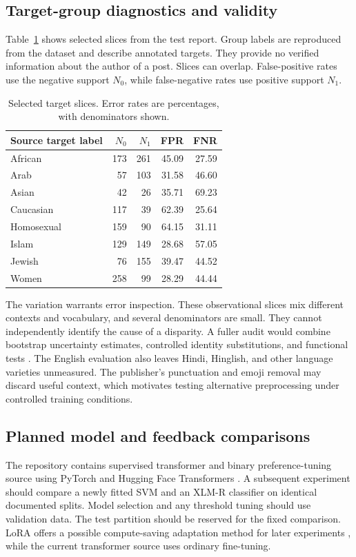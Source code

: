 \documentclass[11pt,a4paper]{article}
\begin{document}
\subsection{Target-group diagnostics and validity}
Table~\ref{tab:groups} shows selected slices from the test report. Group labels
are reproduced from the dataset and describe annotated targets. They provide
no verified information about the author of a post. Slices can overlap.
False-positive rates use the negative support $N_0$, while false-negative rates
use positive support $N_1$.

\begin{table}[ht]
\centering
\caption{Selected target slices. Error rates are percentages, with denominators shown.}
\label{tab:groups}
\begin{tabular}{lrrrr}
\toprule
Source target label & $N_0$ & $N_1$ & FPR & FNR\\
\midrule
African & 173 & 261 & 45.09 & 27.59\\
Arab & 57 & 103 & 31.58 & 46.60\\
Asian & 42 & 26 & 35.71 & 69.23\\
Caucasian & 117 & 39 & 62.39 & 25.64\\
Homosexual & 159 & 90 & 64.15 & 31.11\\
Islam & 129 & 149 & 28.68 & 57.05\\
Jewish & 76 & 155 & 39.47 & 44.52\\
Women & 258 & 99 & 28.29 & 44.44\\
\bottomrule
\end{tabular}
\end{table}

The variation warrants error inspection. These observational slices mix
different contexts and vocabulary, and several denominators are small.
They cannot independently identify the cause of a disparity. A fuller audit
would combine bootstrap uncertainty estimates, controlled identity substitutions,
and functional tests \cite{sap,hatecheck}. The English evaluation also leaves
Hindi, Hinglish, and other language varieties unmeasured. The publisher's
punctuation and emoji removal may discard useful context, which motivates
testing alternative preprocessing under controlled training conditions.

\subsection{Planned model and feedback comparisons}
The repository contains supervised transformer and binary preference-tuning
source using PyTorch and Hugging Face Transformers \cite{pytorch,transformers}.
A subsequent experiment should compare a newly fitted SVM and an XLM-R
classifier on identical documented splits. Model selection and any threshold
tuning should use validation data. The test partition should be reserved for
the fixed comparison. LoRA offers a possible compute-saving adaptation method
for later experiments \cite{lora}, while the current transformer source uses
ordinary fine-tuning.
\end{document}
